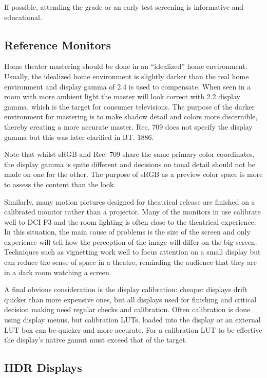 If possible, attending the grade or an early test screening is informative and educational.

\subsection{Reference Monitors}

Home theater mastering should be done in an “idealized” home environment. Usually, the idealized home environment is slightly darker than the real home environment and display gamma of 2.4 is used to compensate. When seen in a room with more ambient light the master will look correct with 2.2 display gamma, which is the target for consumer televisions. The purpose of the darker environment for mastering is to make shadow detail and colors more discernible, thereby creating a more accurate master. Rec. 709 does not specify the display gamma but this was later clarified in BT. 1886.

Note that whilst sRGB and Rec. 709 share the same primary color coordinates, the display gamma is quite different and decisions on tonal detail should not be made on one for the other. The purpose of sRGB as a preview color space is more to assess the content than the look.

Similarly, many motion pictures designed for theatrical release are finished on a calibrated monitor rather than a projector. Many of the monitors in use calibrate well to DCI P3 and the room lighting is often close to the theatrical experience. In this situation, the main cause of problems is the size of the screen and only experience will tell how the perception of the image will differ on the big screen. Techniques such as vignetting work well to focus attention on a small display but can reduce the sense of space in a theatre, reminding the audience that they are in a dark room watching a screen.

A final obvious consideration is the display calibration: cheaper displays drift quicker than more expensive ones, but all displays used for finishing and critical decision making need regular checks and calibration. Often calibration is done using display menus, but calibration LUTs, loaded into the display or an external LUT box can be quicker and more accurate. For a calibration LUT to be effective the display's native gamut must exceed that of the target.

\subsection{HDR Displays}

